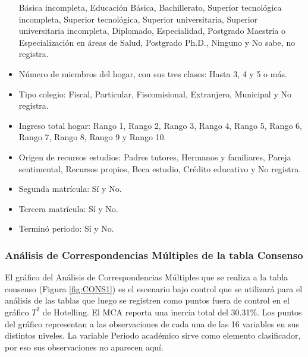 \documentclass[water,article,submit,moreauthors,pdftex]{mdpi}
\begin{document}
\begin{itemize}
  Básica incompleta, Educación Básica, Bachillerato, Superior
  tecnológica incompleta, Superior tecnológica, Superior universitaria,
  Superior universitaria incompleta, Diplomado, Especialidad, Postgrado
  Maestría o Especialización en áreas de Salud, Postgrado Ph.D., Ninguno
  y No sabe, no registra.
\item
  Número de miembros del hogar, con sus tres clases: Hasta 3, 4 y 5 o
  más.
\item
  Tipo colegio: Fiscal, Particular, Fiscomisional, Extranjero, Municipal
  y No registra.
\item
  Ingreso total hogar: Rango 1, Rango 2, Rango 3, Rango 4, Rango 5,
  Rango 6, Rango 7, Rango 8, Rango 9 y Rango 10.
\item
  Origen de recursos estudios: Padres tutores, Hermanos y familiares,
  Pareja sentimental, Recursos propios, Beca estudio, Crédito educativo
  y No registra.
\item
  Segunda matrícula: Sí y No.
\item
  Tercera matrícula: Sí y No.
\item
  Terminó periodo: Sí y No.
\end{itemize}

\hypertarget{anuxe1lisis-de-correspondencias-muxfaltiples-de-la-tabla-consenso}{%
\subsubsection{Análisis de Correspondencias Múltiples de la tabla
Consenso}\label{anuxe1lisis-de-correspondencias-muxfaltiples-de-la-tabla-consenso}}

El gráfico del Análisis de Correspondencias Múltiples que se realiza a
la tabla consenso (Figura \ref{fig:CONS1}) es el escenario bajo control
que se utilizará para el análisis de las tablas que luego se registren
como puntos fuera de control en el gráfico \(T^2\) de Hotelling. El MCA
reporta una inercia total del 30.31\%. Los puntos del gráfico
representan a las observaciones de cada una de las 16 variables en sus
distintos niveles. La variable Periodo académico sirve como elemento
clasificador, por eso sus observaciones no aparecen aquí.
\end{document}
